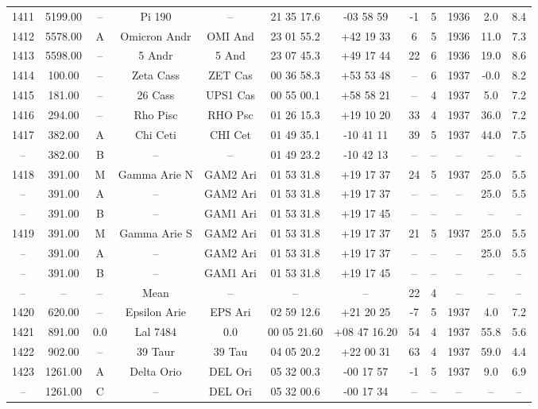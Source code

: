 \begin{table}
\begin{tabular}{cccccccccccc}
1411 & 5199.00 & -- & Pi 190 & -- & 21 35 17.6 & -03 58 59 & -1 & 5 & 1936 & 2.0 & 8.4 \\
1412 & 5578.00 & A & Omicron Andr & OMI And & 23 01 55.2 & +42 19 33 & 6 & 5 & 1936 & 11.0 & 7.3 \\
1413 & 5598.00 & -- & 5 Andr & 5 And & 23 07 45.3 & +49 17 44 & 22 & 6 & 1936 & 19.0 & 8.6 \\
1414 & 100.00 & -- & Zeta Cass & ZET Cas & 00 36 58.3 & +53 53 48 & -- & 6 & 1937 & -0.0 & 8.2 \\
1415 & 181.00 & -- & 26 Cass & UPS1 Cas & 00 55 00.1 & +58 58 21 & -- & 4 & 1937 & 5.0 & 7.2 \\
1416 & 294.00 & -- & Rho Pisc & RHO Psc & 01 26 15.3 & +19 10 20 & 33 & 4 & 1937 & 36.0 & 7.2 \\
1417 & 382.00 & A & Chi Ceti & CHI Cet & 01 49 35.1 & -10 41 11 & 39 & 5 & 1937 & 44.0 & 7.5 \\
-- & 382.00 & B & -- & -- & 01 49 23.2 & -10 42 13 & -- & -- & -- & -- & -- \\
1418 & 391.00 & M & Gamma Arie N & GAM2 Ari & 01 53 31.8 & +19 17 37 & 24 & 5 & 1937 & 25.0 & 5.5 \\
-- & 391.00 & A & -- & GAM2 Ari & 01 53 31.8 & +19 17 37 & -- & -- & -- & 25.0 & 5.5 \\
-- & 391.00 & B & -- & GAM1 Ari & 01 53 31.8 & +19 17 45 & -- & -- & -- & -- & -- \\
1419 & 391.00 & M & Gamma Arie S & GAM2 Ari & 01 53 31.8 & +19 17 37 & 21 & 5 & 1937 & 25.0 & 5.5 \\
-- & 391.00 & A & -- & GAM2 Ari & 01 53 31.8 & +19 17 37 & -- & -- & -- & 25.0 & 5.5 \\
-- & 391.00 & B & -- & GAM1 Ari & 01 53 31.8 & +19 17 45 & -- & -- & -- & -- & -- \\
-- & -- & -- & Mean & -- & -- & -- & 22 & 4 & -- & -- & -- \\
1420 & 620.00 & -- & Epsilon Arie & EPS Ari & 02 59 12.6 & +21 20 25 & -7 & 5 & 1937 & 4.0 & 7.2 \\
1421 & 891.00 & 0.0 & Lal 7484 & 0.0 & 00 05 21.60 & +08 47 16.20 & 54 & 4 & 1937 & 55.8 & 5.6 \\
1422 & 902.00 & -- & 39 Taur & 39 Tau & 04 05 20.2 & +22 00 31 & 63 & 4 & 1937 & 59.0 & 4.4 \\
1423 & 1261.00 & A & Delta Orio & DEL Ori & 05 32 00.3 & -00 17 57 & -1 & 5 & 1937 & 9.0 & 6.9 \\
-- & 1261.00 & C & -- & DEL Ori & 05 32 00.6 & -00 17 34 & -- & -- & -- & -- & -- \\

\end{tabular}
\end{table}
